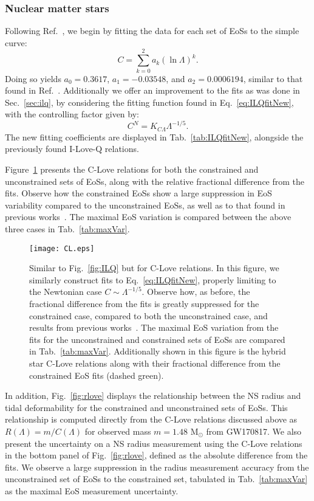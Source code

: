 \documentclass[prd,twocolumn,nofootinbib,superscriptaddress,amsmath,amssymb]{revtex4-1}
\begin{document}
\subsubsection{Nuclear matter stars}\label{sec:clove-nuc}
Following Ref.~\cite{Yagi:binLove}, we begin by fitting the data for each set of EoSs to the simple curve:
\begin{equation}
C = \sum^2_{k=0} a_k (\ln{\Lambda})^k.
\end{equation}
Doing so yields $a_0 = 0.3617$, $a_1 = -0.03548$, and $a_2 = 0.0006194$, similar to that found in Ref.~\cite{Yagi:binLove}.
Additionally we offer an improvement to the fits as was done in Sec.~\ref{sec:ilq}, by considering the fitting function found in Eq.~\ref{eq:ILQfitNew}, with the controlling factor given by:
\begin{equation}
C^N=K_{C\Lambda}\Lambda^{-1/5}.\label{eq:cloveFit}
\end{equation}
The new fitting coefficients are displayed in Tab.~\ref{tab:ILQfitNew}, alongside the previously found I-Love-Q relations.

Figure~\ref{fig:clove} presents the C-Love relations for both the constrained and unconstrained sets of EoSs, along with the relative fractional difference from the fits. 
Observe how the constrained EoSs show a large suppression in EoS variability compared to the unconstrained EoSs, as well as to that found in previous works~\cite{Yagi:binLove}.
The maximal EoS variation is compared between the above three cases in Tab.~\ref{tab:maxVar}.
\begin{figure}
\begin{center} 
\texttt{[image: CL.eps]}
\end{center}
\caption{
Similar to Fig.~\ref{fig:ILQ} but for C-Love relations.
In this figure, we similarly construct fits to  Eq.~\ref{eq:ILQfitNew}, properly limiting to the Newtonian case $C \sim \Lambda^{-1/5}$.
Observe how, as before, the fractional difference from the fits is greatly suppressed for the constrained case, compared to both the unconstrained case, and results from previous works~\cite{Yagi:binLove}.
The maximal EoS variation from the fits for the unconstrained and constrained sets of EoSs are compared in Tab.~\ref{tab:maxVar}.
Additionally shown in this figure is the hybrid star C-Love relations along with their fractional difference from the constrained EoS fits (dashed green).
}
\label{fig:clove}
\end{figure} 

In addition, Fig.~\ref{fig:rlove} displays the relationship between the NS radius and tidal deformability for the constrained and unconstrained sets of EoSs.
This relationship is computed directly from the C-Love relations discussed above as $R(\Lambda)=m/C(\Lambda)$ for observed mass $m=1.48\text{ M}_{\odot}$ from GW170817.
We also present the uncertainty on a NS radius measurement using the C-Love relations in the bottom panel of Fig.~\ref{fig:rlove}, defined as the absolute difference from the fits.
We observe a large suppression in the radius measurement accuracy from the unconstrained set of EoSs to the constrained set, tabulated in Tab.~\ref{tab:maxVar} as the maximal EoS measurement uncertainty.
\end{document}
